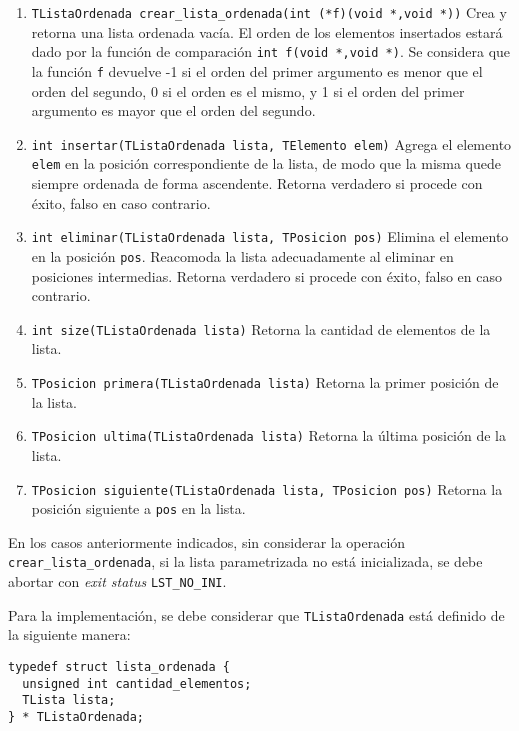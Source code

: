 \documentclass[12pt,a4paper]{article}
\begin{document}
\begin{enumerate}
	
	\item \texttt{TListaOrdenada crear\_lista\_ordenada(int (*f)(void *,void *))} Crea y retorna una lista ordenada vacía. El orden de los elementos insertados estará dado por la función de comparación \texttt{int f(void *,void *)}. Se considera que la función \texttt{f} devuelve -1 si el orden del primer argumento es menor que el orden del segundo, 0 si el orden es el mismo, y 1 si el orden del primer argumento es mayor que el orden del segundo.
	
	\item \texttt{int insertar(TListaOrdenada lista,  TElemento elem)} Agrega el elemento \texttt{elem} en la posición correspondiente de la lista, de modo que la misma quede siempre ordenada de forma ascendente. Retorna verdadero si procede con éxito, falso en caso contrario.
	
	\item \texttt{int eliminar(TListaOrdenada lista, TPosicion pos)} Elimina el elemento en la posición \texttt{pos}. Reacomoda la lista adecuadamente al eliminar en posiciones intermedias. Retorna verdadero si procede con éxito, falso en caso contrario.
	
	\item \texttt{int size(TListaOrdenada lista)} Retorna la cantidad de elementos de la lista.
	
	\item \texttt{TPosicion primera(TListaOrdenada lista)} Retorna la primer posición de la lista.
	
	\item \texttt{TPosicion ultima(TListaOrdenada lista)} Retorna la última posición de la lista.

	\item \texttt{TPosicion siguiente(TListaOrdenada lista, TPosicion pos)} Retorna la posición siguiente a \texttt{pos} en la lista.
	
\end{enumerate}

En los casos anteriormente indicados, sin considerar la operación \texttt{crear\_lista\_ordenada}, si la lista parametrizada no está inicializada, se debe abortar con \emph{exit status} \texttt{LST\_NO\_INI}.

Para la implementación, se debe considerar que \texttt{TListaOrdenada} está definido de la siguiente manera:

\begin{verbatim}
typedef struct lista_ordenada {
  unsigned int cantidad_elementos;
  TLista lista;
} * TListaOrdenada;
\end{verbatim}
\end{document}
